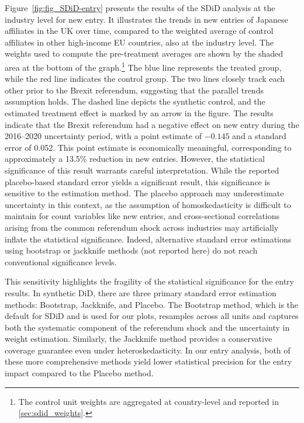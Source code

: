 \documentclass[preprint,11pt,authoryear]{elsarticle}
\begin{document}
Figure~\ref{fig:fig_SDiD-entry} presents the results of the SDiD analysis at the industry level for new entry. It illustrates the trends in new entries of Japanese affiliates in the UK over time, compared to the weighted average of control affiliates in other high-income EU countries, also at the industry level. The weights used to compute the pre-treatment averages are shown by the shaded area at the bottom of the graph.\footnote{The control unit weights are aggregated at country-level and reported in \ref{sec:sdid_weights}.} The blue line represents the treated group, while the red line indicates the control group. The two lines closely track each other prior to the Brexit referendum, suggesting that the parallel trends assumption holds.
The dashed line depicts the synthetic control, and the estimated treatment effect is marked by an arrow in the figure. The results indicate that the Brexit referendum had a negative effect on new entry during the 2016--2020 uncertainty period, with a point estimate of $-0.145$ and a standard error of 0.052. This point estimate is economically meaningful, corresponding to approximately a 13.5\% reduction in new entries. However, the statistical significance of this result warrants careful interpretation. While the reported placebo-based standard error yields a significant result, this significance is sensitive to the estimation method. The placebo approach may underestimate uncertainty in this context, as the assumption of homoskedasticity is difficult to maintain for count variables like new entries, and cross-sectional correlations arising from the common referendum shock across industries may artificially inflate the statistical significance. Indeed, alternative standard error estimations using bootstrap or jackknife methods (not reported here) do not reach conventional significance levels. 

This sensitivity highlights the fragility of the statistical significance for the entry results. In synthetic DiD, there are three primary standard error estimation methods: Bootstrap, Jackknife, and Placebo. The Bootstrap method, which is the default for SDiD and is used for our plots, resamples across all units and captures both the systematic component of the referendum shock and the uncertainty in weight estimation. Similarly, the Jackknife method provides a conservative coverage guarantee even under heteroskedasticity. In our entry analysis, both of these more comprehensive methods yield lower statistical precision for the entry impact compared to the Placebo method. 
\end{document}
